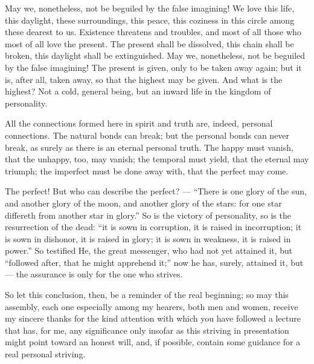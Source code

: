 \documentclass[12pt,a4paper]{book}
\begin{document}
May we, nonetheless, not be beguiled by the false imagining! We love this life, this daylight, these surroundings, this peace, this coziness in this circle among these dearest to us. Existence threatens and troubles, and most of all those who most of all love the present. The present shall be dissolved, this chain shall be broken, this daylight shall be extinguished. May we, nonetheless, not be beguiled by the false imagining! The present is given, only to be taken away again; but it is, after all, taken away, so that the highest may be given. And what is the highest? Not a cold, general being, but an inward life in the kingdom of personality.

All the connections formed here in spirit and truth are, indeed, personal connections. The natural bonds can break; but the personal bonds can never break, as surely as there is an eternal personal truth. The happy must vanish, that the unhappy, too, may vanish; the temporal must yield, that the eternal may triumph; the imperfect must be done away with, that the perfect may come.

The perfect! But who can describe the perfect? --- ``There is one glory of the sun, and another glory of the moon, and another glory of the stars: for one star differeth from another star in glory.'' So is the victory of personality, so is the resurrection of the dead: ``it is sown in corruption, it is raised in incorruption; it is sown in dishonor, it is raised in glory; it is sown in weakness, it is raised in power.'' So testified He, the great messenger, who had not yet attained it, but ``followed after, that he might apprehend it;'' now he has, surely, attained it, but --- the assurance is only for the one who strives.

So let this conclusion, then, be a reminder of the real beginning; so may this assembly, each one especially
among my hearers, both men and women, receive my sincere thanks for the kind attention with which you have followed a lecture that has, for me, any significance only insofar as this striving in presentation might point toward an honest will, and, if possible, contain some guidance for a real personal striving.
\end{document}
